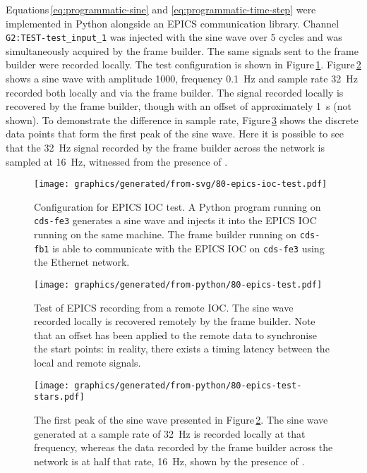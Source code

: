 Equations\,\ref{eq:programmatic-sine} and \ref{eq:programmatic-time-step} were implemented in Python alongside an \gls{EPICS} communication library. Channel \lstinline{G2:TEST-test_input_1} was injected with the sine wave over \num{5} cycles and was simultaneously acquired by the frame builder. The same signals sent to the frame builder were recorded locally. The test configuration is shown in Figure\,\ref{fig:epics-ioc-test}. Figure\,\ref{fig:epics-test} shows a sine wave with amplitude \num{1000}, frequency \SI{0.1}{\hertz} and sample rate \SI{32}{\hertz} recorded both locally and via the frame builder. The signal recorded locally is recovered by the frame builder, though with an offset of approximately \SI{1}{\second} (not shown). To demonstrate the difference in sample rate, Figure\,\ref{fig:epics-test-stars} shows the discrete data points that form the first peak of the sine wave. Here it is possible to see that the \SI{32}{\hertz} signal recorded by the frame builder across the network is sampled at \SI{16}{\hertz}, witnessed from the presence of .

\begin{figure}
  \centering
  \texttt{[image: graphics/generated/from-svg/80-epics-ioc-test.pdf]}
  \caption{\label{fig:epics-ioc-test}Configuration for EPICS IOC test. A Python program running on \lstinline{cds-fe3} generates a sine wave and injects it into the EPICS IOC running on the same machine. The frame builder running on \lstinline{cds-fb1} is able to communicate with the EPICS IOC on \lstinline{cds-fe3} using the Ethernet network.}
\end{figure}

\begin{figure}
  \centering
  \texttt{[image: graphics/generated/from-python/80-epics-test.pdf]}
  \caption{\label{fig:epics-test}Test of EPICS recording from a remote IOC. The sine wave recorded locally is recovered remotely by the frame builder. Note that an offset has been applied to the remote data to synchronise the start points: in reality, there exists a timing latency between the local and remote signals.}
\end{figure}

\begin{figure}
  \centering
  \texttt{[image: graphics/generated/from-python/80-epics-test-stars.pdf]}
  \caption{\label{fig:epics-test-stars}The first peak of the sine wave presented in Figure\,\ref{fig:epics-test}. The sine wave generated at a sample rate of \SI{32}{\hertz} is recorded locally at that frequency, whereas the data recorded by the frame builder across the network is at half that rate, \SI{16}{\hertz}, shown by the presence of .}
\end{figure}

